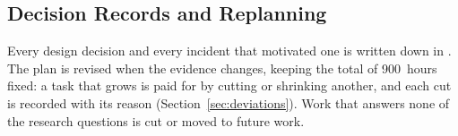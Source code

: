 
\subsection{Decision Records and Replanning}
\label{subsec:replanning}

Every design decision and every incident that motivated one is
written down in . The plan is revised when
the evidence changes, keeping the total of 900~hours fixed: a task
that grows is paid for by cutting or shrinking another, and each cut
is recorded with its reason (Section~\ref{sec:deviations}). Work that
answers none of the research questions is cut or moved to future
work.
